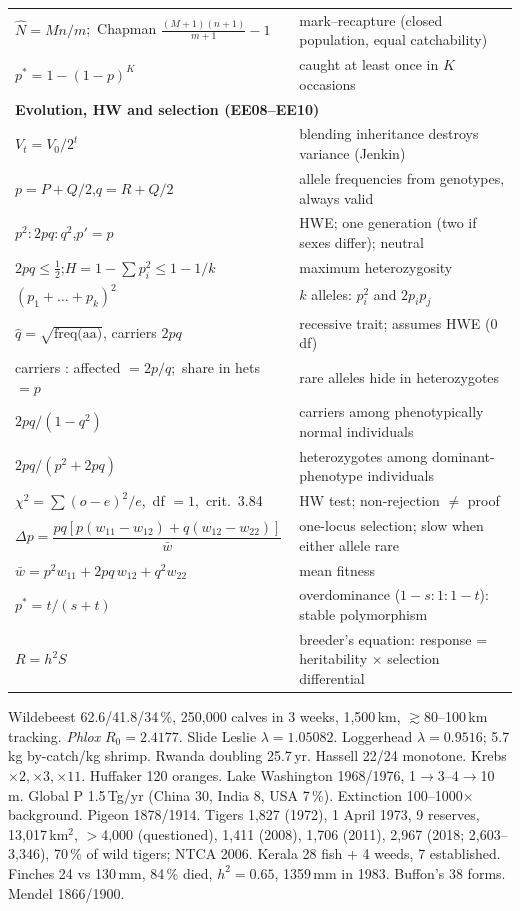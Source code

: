 {\begin{longtable}{p{}p{}}
$\hat N=Mn/m$;\ Chapman $\frac{(M+1)(n+1)}{m+1}-1$ & mark--recapture (closed population, equal catchability)\\
$p^*=1-(1-p)^K$ & caught at least once in $K$ occasions\\
\midrule
\multicolumn{2}{l}{\textbf{Evolution, HW and selection (EE08--EE10)}}\\
$V_t=V_0/2^t$ & blending inheritance destroys variance (Jenkin)\\
$p=P+Q/2$,\quad $q=R+Q/2$ & allele frequencies from genotypes, always valid\\
$p^2:2pq:q^2$,\quad $p'=p$ & HWE; one generation (two if sexes differ); neutral\\
$2pq\le\tfrac12$;\quad $H=1-\sum p_i^2\le 1-1/k$ & maximum heterozygosity\\
$(p_1+\dots+p_k)^2$ & $k$ alleles: $p_i^2$ and $2p_ip_j$\\
$\hat q=\sqrt{\text{freq(aa)}}$, carriers $2pq$ & recessive trait; assumes HWE (0 df)\\
carriers : affected $=2p/q$;\ share in hets $=p$ & rare alleles hide in heterozygotes\\
$2pq/(1-q^2)$ & carriers among phenotypically normal individuals\\
$2pq/(p^2+2pq)$ & heterozygotes among dominant-phenotype individuals\\
$\chi^2=\sum(o-e)^2/e$,\ df $=1$,\ crit.\ 3.84 & HW test; non-rejection $\neq$ proof\\
$\Delta p=\dfrac{pq[p(w_{11}-w_{12})+q(w_{12}-w_{22})]}{\bar w}$ & one-locus selection; slow when either allele rare\\
$\bar w=p^2w_{11}+2pq\,w_{12}+q^2w_{22}$ & mean fitness\\
$p^*=t/(s+t)$ & overdominance ($1-s:1:1-t$): stable polymorphism\\
$R=h^2S$ & breeder's equation: response = heritability $\times$ selection differential\\
\bottomrule
\end{longtable}
}

\begin{numbers}
Wildebeest 62.6/41.8/34\,\%, 250{,}000 calves in 3 weeks, 1{,}500\,km, $\gtrsim$80--100\,km tracking. \emph{Phlox}
$R_0=2.4177$. Slide Leslie $\lambda=1.05082$. Loggerhead $\lambda=0.9516$; 5.7\,kg by-catch/kg shrimp. Rwanda doubling
25.7\,yr. Hassell 22/24 monotone. Krebs $\times2,\times3,\times11$. Huffaker 120 oranges. Lake Washington 1968/1976,
1$\to$3--4$\to$10\,m. Global P 1.5\,Tg/yr (China 30, India 8, USA 7\,\%). Extinction 100--1000$\times$ background.
Pigeon 1878/1914. Tigers 1{,}827 (1972), 1 April 1973, 9 reserves, 13{,}017\,km$^2$, $>$4{,}000 (questioned), 1{,}411
(2008), 1{,}706 (2011), 2{,}967 (2018; 2{,}603--3{,}346), 70\,\% of wild tigers; NTCA 2006. Kerala 28 fish + 4 weeds, 7
established. Finches 24 vs 130\,mm, 84\,\% died, $h^2=0.65$, 1359\,mm in 1983. Buffon's 38 forms. Mendel 1866/1900.
\end{numbers}
